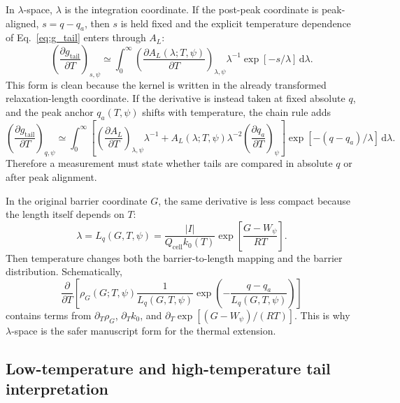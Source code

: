 \documentclass[11pt,a4paper]{article}
\newcommand{\dd}{\mathrm{d}}
\newcommand{\cell}{\mathrm{cell}}
\newcommand{\tail}{\mathrm{tail}}
\begin{document}
In \(\lambda\)-space, \(\lambda\) is the integration coordinate. If the post-peak coordinate is
peak-aligned, \(s=q-q_a\), then \(s\) is held fixed and the explicit temperature dependence of
Eq.~\eqref{eq:g_tail} enters through \(A_L\):
\begin{equation}
\left(\frac{\partial g_{\tail}}{\partial T}\right)_{s,\psi}
\simeq
\int_0^\infty
\left(\frac{\partial A_L(\lambda;T,\psi)}{\partial T}\right)_{\lambda,\psi}
\lambda^{-1}
\exp[-s/\lambda]\,\dd\lambda.
\label{eq:g_tail_T_lambda}
\end{equation}
This form is clean because the kernel is written in the already transformed relaxation-length coordinate.
If the derivative is instead taken at fixed absolute \(q\), and the peak anchor \(q_a(T,\psi)\) shifts with
temperature, the chain rule adds
\begin{equation}
\left(\frac{\partial g_{\tail}}{\partial T}\right)_{q,\psi}
\simeq
\int_0^\infty
\left[
\left(\frac{\partial A_L}{\partial T}\right)_{\lambda,\psi}\lambda^{-1}
+
A_L(\lambda;T,\psi)\lambda^{-2}
\left(\frac{\partial q_a}{\partial T}\right)_{\psi}
\right]
\exp[-(q-q_a)/\lambda]\,\dd\lambda.
\label{eq:g_tail_T_absolute}
\end{equation}
Therefore a measurement must state whether tails are compared in absolute \(q\) or after peak alignment.

In the original barrier coordinate \(G\), the same derivative is less compact because the length itself depends
on \(T\):
\begin{equation}
\lambda=L_q(G,T,\psi)
=
\frac{|I|}{Q_{\cell}k_0(T)}
\exp\!\left[\frac{G-W_{\psi}}{RT}\right].
\label{eq:lambda_G}
\end{equation}
Then temperature changes both the barrier-to-length mapping and the barrier distribution. Schematically,
\begin{equation}
\frac{\partial}{\partial T}
\left[
\rho_G(G;T,\psi)
\frac{1}{L_q(G,T,\psi)}
\exp\!\left(-\frac{q-q_a}{L_q(G,T,\psi)}\right)
\right]
\label{eq:G_space_derivative}
\end{equation}
contains terms from \(\partial_T\rho_G\), \(\partial_Tk_0\), and
\(\partial_T\exp[(G-W_\psi)/(RT)]\). This is why \(\lambda\)-space is the safer manuscript form for the
thermal extension.

\subsection{Low-temperature and high-temperature tail interpretation}\label{sec:temperature_tail}
\end{document}
